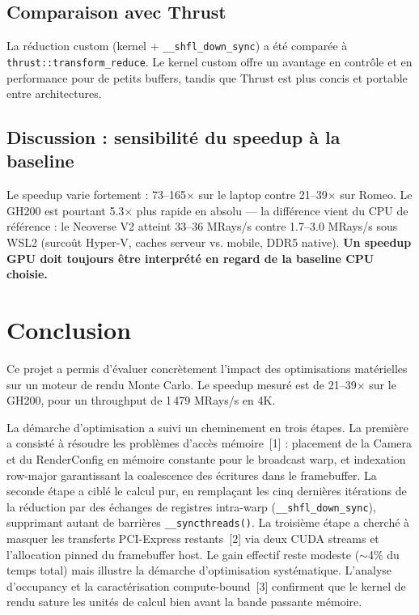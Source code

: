 \documentclass[12pt,a4paper]{article}
\begin{document}
\subsection{Comparaison avec Thrust}

La r\'{e}duction custom (kernel + \texttt{\_\_shfl\_down\_sync}) a \'{e}t\'{e} compar\'{e}e \`{a} \texttt{thrust::transform\_reduce}. Le kernel custom offre un avantage en contr\^{o}le et en performance pour de petits buffers, tandis que Thrust est plus concis et portable entre architectures.

\subsection{Discussion : sensibilit\'{e} du speedup \`{a} la baseline}

Le speedup varie fortement : 73--165$\times$ sur le laptop contre 21--39$\times$ sur Romeo. Le GH200 est pourtant 5.3$\times$ plus rapide en absolu --- la diff\'{e}rence vient du CPU de r\'{e}f\'{e}rence : le Neoverse V2 atteint 33--36 MRays/s contre 1.7--3.0 MRays/s sous WSL2 (surco\^{u}t Hyper-V, caches serveur vs. mobile, DDR5 native). \textbf{Un speedup GPU doit toujours \^{e}tre interpr\'{e}t\'{e} en regard de la baseline CPU choisie.}

\section{Conclusion}

Ce projet a permis d'\'{e}valuer concr\`{e}tement l'impact des optimisations mat\'{e}rielles sur un moteur de rendu Monte Carlo. Le speedup mesur\'{e} est de 21--39$\times$ sur le GH200, pour un throughput de 1\,479 MRays/s en 4K.

La d\'{e}marche d'optimisation a suivi un cheminement en trois \'{e}tapes. La premi\`{e}re a consist\'{e} \`{a} r\'{e}soudre les probl\`{e}mes d'acc\`{e}s m\'{e}moire~[1] : placement de la Camera et du RenderConfig en m\'{e}moire constante pour le broadcast warp, et indexation row-major garantissant la coalescence des \'{e}critures dans le framebuffer. La seconde \'{e}tape a cibl\'{e} le calcul pur, en rempla\c{c}ant les cinq derni\`{e}res it\'{e}rations de la r\'{e}duction par des \'{e}changes de registres intra-warp (\texttt{\_\_shfl\_down\_sync}), supprimant autant de barri\`{e}res \texttt{\_\_syncthreads()}. La troisi\`{e}me \'{e}tape a cherch\'{e} \`{a} masquer les transferts PCI-Express restants~[2] via deux CUDA streams et l'allocation pinned du framebuffer host. Le gain effectif reste modeste ($\sim$4\% du temps total) mais illustre la d\'{e}marche d'optimisation syst\'{e}matique. L'analyse d'occupancy et la caract\'{e}risation compute-bound~[3] confirment que le kernel de rendu sature les unit\'{e}s de calcul bien avant la bande passante m\'{e}moire.
\end{document}
